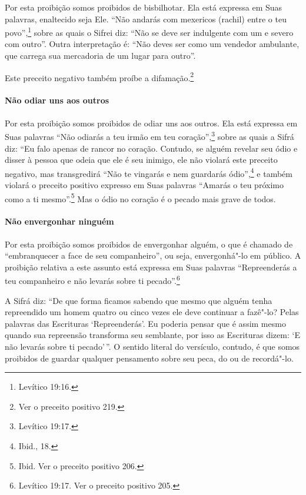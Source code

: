 \begin{multicols}{2}
Por esta proibição somos proibidos de bisbilhotar. Ela está expressa em
Suas palavras, enaltecido seja Ele. ``Não andarás com mexericos (rachil\starr)
entre o teu povo'',\footnote{Levítico 19:16.} sobre as quais o Sifrei\starr{} diz: ``Não
se deve ser indulgente com um e severo com outro''. Outra interpretação
é: ``Não deves ser como um vendedor ambulante, que carrega sua
mercadoria de um lugar para outro''.

Este preceito negativo também proíbe a difamação.\footnote{Ver o preceito positivo 219.}

\paragraph{Não odiar uns aos outros}

Por esta proibição somos proibidos de odiar uns aos outros. Ela está
expressa em Suas palavras ``Não odiarás a teu irmão em teu coração'',\footnote{Levítico 19:17.} sobre as quais a Sifrá\starr{} diz: ``Eu falo apenas de rancor
no coração. Contudo, se alguém revelar seu ódio e
disser à pessoa que odeia que ele é seu inimigo, ele não violará este
preceito negativo, mas transgredirá ``Não te vingarás e nem guardarás
ódio'',\footnote{Ibid., 18.} e também violará o preceito positivo expresso em
Suas palavras ``Amarás o teu próximo como a ti mesmo''.\footnote{Ibid. Ver o preceito positivo 206.} Mas o ódio no coração é o pecado mais grave de todos.

\paragraph{Não envergonhar ninguém}

Por esta proibição somos proibidos de envergonhar alguém, o que é
chamado de ``embranquecer a face de seu companheiro'', ou seja,
envergonhá"-lo em público. A proibição relativa a este assunto está expressa em
Suas palavras ``Repreenderás a teu companheiro e não levarás sobre ti
pecado''.\footnote{Levítico 19:17. Ver o preceito positivo 205.}

A Sifrá\starr{} diz: ``De que forma ficamos sabendo que mesmo que alguém tenha
repreendido um homem quatro ou cinco vezes ele deve continuar a fazê"-lo?
Pelas palavras das Escrituras `Repreenderás'. Eu poderia pensar que é
assim mesmo quando sua repreensão transforma seu semblante, por isso as
Escrituras dizem: `E não levarás sobre ti pecado'\,''. O sentido literal
do versículo, contudo, é que somos proibidos de guardar qualquer
pensamento sobre seu peca, do ou de recordá"-lo.


\end{multicols}
